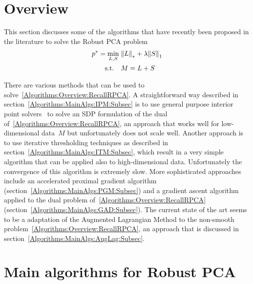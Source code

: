 \documentclass{../../common/projectreport}
\begin{document}
\section{Overview}
\label{Algorithms:Overview:Sec}

This section discusses some of the algorithms that have recently been proposed in the literature to solve the Robust PCA problem
%
\begin{align}
\begin{split}
p^* = \min_{L,S} \; &{\left\|L\right\|}_{*}^{} + \lambda {\left\|S\right\|}_{1}^{} \\
\text{s.t.} \quad &M = L+S
\end{split}
\label{Algorithms:Overview:RecallRPCA}
\end{align}

There are various methods that can be used to solve~\eqref{Algorithms:Overview:RecallRPCA}. A straightforward way described in section~\ref{Algorithms:MainAlgs:IPM:Subsec} is to use general purpose interior point solvers~\cite{Sturm:1999uq,Toh:1999kx} to solve an SDP formulation of the dual of~\eqref{Algorithms:Overview:RecallRPCA}, an approach that works well for low-dimensional data~$M$ but unfortunately does not scale well. Another approach is to use iterative thresholding techniques as described in section~\ref{Algorithms:MainAlgs:ITM:Subsec}, which result in a very simple algorithm that can be applied also to high-dimensional data. Unfortunately the convergence of this algorithm is extremely slow. More sophisticated approaches include an accelerated proximal gradient algorithm (section~\ref{Algorithms:MainAlgs:PGM:Subsec}) and a gradient ascent algorithm applied to the dual problem of~\eqref{Algorithms:Overview:RecallRPCA} (section~\ref{Algorithms:MainAlgs:GAD:Subsec}). The current state of the art seems to be a adaptation of the Augmented Lagrangian Method to the non-smooth problem~\eqref{Algorithms:Overview:RecallRPCA}, an approach that is discussed in section~\ref{Algorithms:MainAlgs:AugLag:Subsec}.



\section{Main algorithms for Robust PCA}
\label{Algorithms:MainAlgs:Sec}

\end{document}
